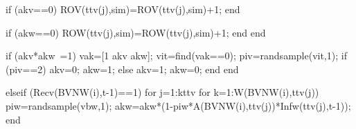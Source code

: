                                                           
                                                          if (akv==0)
                                                             ROV(ttv(j),sim)=ROV(ttv(j),sim)+1;
                                                          end
                                                          
                                                          if (akw==0)
                                                             ROW(ttv(j),sim)=ROW(ttv(j),sim)+1;
                                                          end
                                                    end  
                                                     
                                                                if (akv*akw~=1)                                                                     
                                                                       vak=[1 akv akw];
                                                                       vit=find(vak==0); 
                                                                       piv=randsample(vit,1);
                                                                       if (piv==2)
                                                                            akv=0;
                                                                            akw=1;
                                                                       else
                                                                            akv=1;
                                                                            akw=0;
                                                                       end                                                                       
                                                                end
                                          
                                          elseif (Recv(BVNW(i),t-1)==1)
                                                     for j=1:kttv                                                                                                  
                                                          for k=1:W(BVNW(i),ttv(j))                                                              
                                                                piw=randsample(vbw,1);
                                                                akw=akw*(1-piw*A(BVNW(i),ttv(j))*Infw(ttv(j),t-1));                                                                 
                                                          end                                                                                                                   
                                                          
